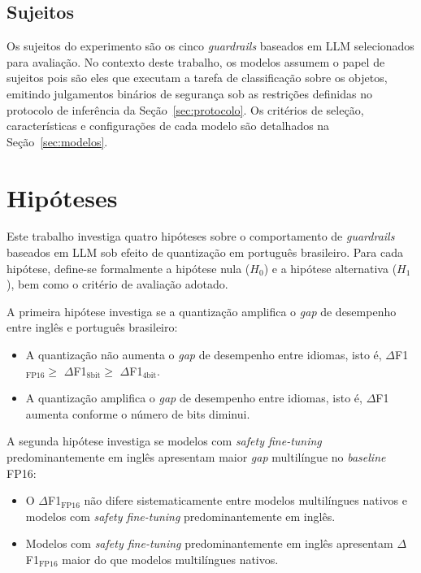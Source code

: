 \subsection{Sujeitos}
\label{sec:sujeitos}
Os sujeitos do experimento são os cinco \textit{guardrails} baseados em LLM selecionados para avaliação. No contexto deste trabalho, os modelos assumem o papel de sujeitos pois são eles que executam a tarefa de classificação sobre os objetos, emitindo julgamentos binários de segurança sob as restrições definidas no protocolo de inferência da Seção~\ref{sec:protocolo}. Os critérios de seleção, características e configurações de cada modelo são detalhados na Seção~\ref{sec:modelos}.

\section{Hipóteses}
\label{sec:hipoteses}

Este trabalho investiga quatro hipóteses sobre o comportamento de \textit{guardrails} baseados em LLM sob efeito de quantização em português brasileiro. Para cada hipótese, define-se formalmente a hipótese nula ($H_0$) e a hipótese alternativa ($H_1$), bem como o critério de avaliação adotado.

A primeira hipótese investiga se a quantização amplifica o \textit{gap} de desempenho entre inglês e português brasileiro:

\begin{itemize}
	\item[$H_0^1$:] A quantização não aumenta o \textit{gap} de desempenho entre idiomas, isto é, $\Delta$F1$_{\text{FP16}} \geq$ $\Delta$F1$_{\text{8bit}} \geq$ $\Delta$F1$_{\text{4bit}}$.
	\item[$H_1^1$:] A quantização amplifica o \textit{gap} de desempenho entre idiomas, isto é, $\Delta$F1 aumenta conforme o número de bits diminui.
\end{itemize}

A segunda hipótese investiga se modelos com \textit{safety fine-tuning} predominantemente em inglês apresentam maior \textit{gap} multilíngue no \textit{baseline} FP16:

\begin{itemize}
	\item[$H_0^2$:] O $\Delta$F1$_{\text{FP16}}$ não difere sistematicamente entre modelos multilíngues nativos e modelos com \textit{safety fine-tuning} predominantemente em inglês.
	\item[$H_1^2$:] Modelos com \textit{safety fine-tuning} predominantemente em inglês apresentam $\Delta$F1$_{\text{FP16}}$ maior do que modelos multilíngues nativos.
\end{itemize}

